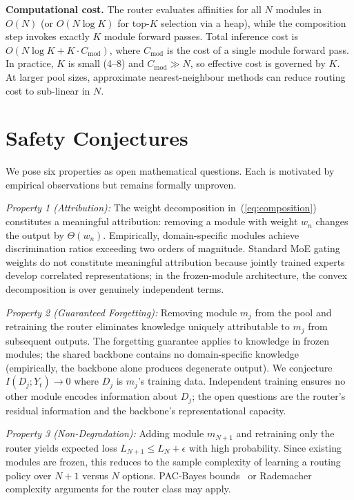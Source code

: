\documentclass[conference]{IEEEtran}
\begin{document}
\textbf{Computational cost.} The router evaluates affinities for all $N$ modules in $O(N)$ (or $O(N \log K)$ for top-$K$ selection via a heap), while the composition step invokes exactly $K$ module forward passes. Total inference cost is $O(N \log K + K \cdot C_{\text{mod}})$, where $C_{\text{mod}}$ is the cost of a single module forward pass. In practice, $K$ is small (4--8) and $C_{\text{mod}} \gg N$, so effective cost is governed by $K$. At larger pool sizes, approximate nearest-neighbour methods can reduce routing cost to sub-linear in $N$.

\section{Safety Conjectures}

We pose six properties as open mathematical questions. Each is motivated by empirical observations but remains formally unproven.

\emph{Property 1 (Attribution):} The weight decomposition in~(\ref{eq:composition}) constitutes a meaningful attribution: removing a module with weight $w_n$ changes the output by $\Theta(w_n)$. Empirically, domain-specific modules achieve discrimination ratios exceeding two orders of magnitude. Standard MoE gating weights do not constitute meaningful attribution because jointly trained experts develop correlated representations; in the frozen-module architecture, the convex decomposition is over genuinely independent terms.

\emph{Property 2 (Guaranteed Forgetting):} Removing module $m_j$ from the pool and retraining the router eliminates knowledge uniquely attributable to $m_j$ from subsequent outputs. The forgetting guarantee applies to knowledge in frozen modules; the shared backbone contains no domain-specific knowledge (empirically, the backbone alone produces degenerate output). We conjecture $I(D_j; Y_t) \to 0$ where $D_j$ is $m_j$'s training data. Independent training ensures no other module encodes information about $D_j$; the open questions are the router's residual information and the backbone's representational capacity.

\emph{Property 3 (Non-Degradation):} Adding module $m_{N+1}$ and retraining only the router yields expected loss $L_{N+1} \leq L_N + \epsilon$ with high probability. Since existing modules are frozen, this reduces to the sample complexity of learning a routing policy over $N{+}1$ versus $N$ options. PAC-Bayes bounds~\cite{mcallester1999pac} or Rademacher complexity arguments for the router class may apply.
\end{document}

